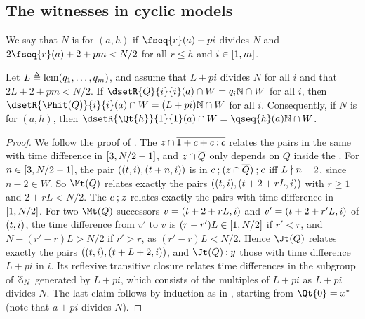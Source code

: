 \subsection{The witnesses in cyclic models}
\AP We say that $N$ is  for $(a, h)$ if $\fseq{r}(a) + p i$ divides $N$ and $2 \fseq{r}(a) + 2 + p m < N/2$ for all $r \le h$ and $i \in [1, m]$.
\begin{lemma}\label{lemma: one step cyclic}
    Let $L \defeq \lcm(q_1, \dots, q_m)$, and assume that $L + p i$ divides $N$ for all $i$ and that $2L + 2 + p m < N/2$.
    If $\dsetR{Q}{i}{i}(a) \cap W = q_i \nat \cap W$ for all $i$, then $\dsetR{\Phit(Q)}{i}{i}(a) \cap W = (L + p i) \nat \cap W$ for all $i$.
    Consequently, if $N$ is  for $(a, h)$, then $\dsetR{\Qt{h}}{1}{1}(a) \cap W = \qseq{h}(a) \nat \cap W$.
\end{lemma}
\begin{proof}
    We follow the proof of .
    The  $z \mathbin{\cap} \overline{\mathsf{1} \mathbin{+} c \mathbin{+} c \mathbin{;} c}$ relates the pairs in the same  with time difference in $[3, N/2 - 1]$, and $z \mathbin{\cap} \overline{Q}$ only depends on $Q$ inside the .
    For $n \in [3, N/2 - 1]$, the pair $((t, i), (t + n, i))$ is in $c \mathbin{;} (z \mathbin{\cap} \overline{Q}) \mathbin{;} c$ iff $L \nmid n - 2$, since $n - 2 \in W$.
    So $\Mt(Q)$ relates exactly the pairs $((t, i), (t + 2 + r L, i))$ with $r \ge 1$ and $2 + rL < N/2$.
    The  $c \mathbin{;} z$ relates exactly the pairs with time difference in $[1, N/2]$.
    For two $\Mt(Q)$-successors $v = (t + 2 + rL, i)$ and $v' = (t + 2 + r'L, i)$ of $(t, i)$, the time difference from $v'$ to $v$ is $(r - r')L \in [1, N/2]$ if $r' < r$, and $N - (r' - r)L > N/2$ if $r' > r$, as $(r' - r)L < N/2$.
    Hence $\Jt(Q)$ relates exactly the pairs $((t, i), (t + L + 2, i))$, and $\Jt(Q) \compo y$ those with time difference $L + p i$ in  $i$.
    Its reflexive transitive closure relates time differences in the subgroup of $\mathbb{Z}_N$ generated by $L + p i$, which consists of the multiples of $L + pi$ as $L + p i$ divides $N$.
    The last claim follows by induction as in , starting from $\Qt{0} = x^{*}$ (note that $a + p i$ divides $N$).
\end{proof}

